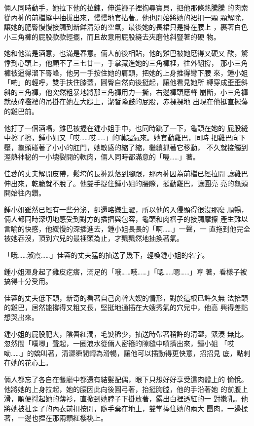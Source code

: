 倆人同時動手，她拉下他的拉鍊，伸進褲子裡掏尋寶貝，把他那條熱騰騰
的肉索從內褲的前檔縫中抽拔出來，慢慢地套拈著。他也開始將她的裙扣一顆
顆解除，讓她的肥臀慢慢接觸到新鮮清涼的空氣，最後她的長裙只是掛在腰上
，裹著白色小三角褲的屁股款款輕擺，而且故意用屁股縫去夾磨他斜豎著的硬
物。

她和他滿是酒意，也滿是春意。倆人前後相貼，他的雞巴被她磨得又硬又
酸，驚悸到心頭上，他顧不了三七廿一，手掌藏進她的三角褲裡，往外翻撐，
那小三角褲被逼得溜下臀峰，他另一手按住她的肩頭，把她的上身推得彎下腰
來，鍾小姐「喲」的輕呼，雙手扶住膝蓋，圓臀自然向後挺起，讓他看見她所
縛穿成歪歪斜斜的三角褲，他突然粗暴地將那三角褲用力一撕，右邊褲頭應聲
崩斷，小三角褲就破碎襤褸的吊掛在她左大腿上，潔皙隆鼓的屁股，赤裸裸地
出現在他挺直擺蕩的雞巴前。

他打了一個酒嗝，雞巴被握在鍾小姐手中，也同時跳了一下，龜頭在她的
屁股縫中擦了擦，鍾小姐又「哎……哎……」的嘆起氣來。她套動雞巴，同時
把雞巴向下壓，龜頭碰著了小小的肛門，她敏感的縮了縮，繼續抓著它移動，
不久就接觸到溼熱神秘的一小塊裂開的軟肉，倆人同時都滿意的「喔……」著。

佳蓉的丈夫解開皮帶，鬆垮的長褲跌落到腳跟，那內褲因為前檔已經拉開
讓雞巴伸出來，乾脆就不脫了。他雙手捉住鍾小姐的腰際，挺動雞巴，讓圓亮
亮的龜頭開始往內鑽。

鍾小姐雖然已經有一些分泌，卻還略嫌生澀，所以他的入侵顯得很沒那麼
順暢，倆人都同時深切地感受到對方的插擠與包容，龜頭和肉褶子的接觸摩擦
產生難以言喻的快感，他緩慢的深插進去，鍾小姐長長的「啊……」一聲，一
直拖到他完全被她吞沒，頂到穴兒的最裡頭為止，才飄飄然地抽換著氣。

「哦……淑霞……」佳蓉的丈夫猛的抽送了幾下，輕喚鍾小姐的名字。

鍾小姐渾身起了雞皮疙瘩，滿足的「哦……哦……」「嗯……嗯……」哼
著，看樣子被搞得十分受用。

佳蓉的丈夫低下頭，新奇的看著自己肏幹大嫂的情形，對於這根已許久無
法抬頭的雞巴，居然能撐得又粗又長，堅挺地通插在大嫂秀氣的穴兒中，他高
興得差點想哭出來。

鍾小姐的屁股肥大，陰唇紅潤，毛髮稀少，抽送時帶著稍許的清澀，緊湊
無比。忽然間「噗唧」聲起，一圈浪水從倆人密箍的隙縫中噴擠出來，鍾小姐
「哎呦……」的嬌叫著，清澀瞬間轉為滑暢，讓他可以插動得更快意，招招見
底，點刺在她的花心上。

倆人都忘了各自在餐廳中都還有結髮配偶，眼下只想好好享受這肉體上的
愉悅。他將她的上身拉起，她的腰因此向後圓弓著，抬挺胸膛，他的手沿著她
的前腹上滑，順便捋起她的薄衫，直掀到她脖子下掛放著，露出白裡透紅的一
對嫩乳。他將她被扯歪了的內衣前扣按開，隨手棄在地上，雙掌捧住她的兩大
團肉，一邊揉著，一邊也捏在那兩顆紅櫻桃上。

